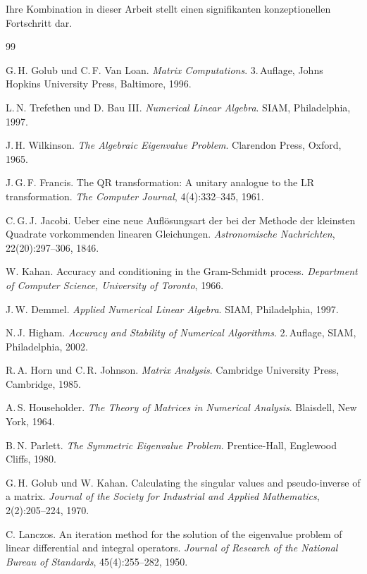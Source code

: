 \documentclass[a4paper,12pt]{article}
\theoremstyle{definition}
\begin{document}
Ihre Kombination in dieser Arbeit stellt einen signifikanten konzeptionellen Fortschritt dar.

\begin{thebibliography}{99}

G.\,H. Golub und C.\,F. Van Loan. \textit{Matrix Computations}. 3.\,Auflage, Johns Hopkins University Press, Baltimore, 1996.

L.\,N. Trefethen und D. Bau III. \textit{Numerical Linear Algebra}. SIAM, Philadelphia, 1997.

J.\,H. Wilkinson. \textit{The Algebraic Eigenvalue Problem}. Clarendon Press, Oxford, 1965.

J.\,G.\,F. Francis. The QR transformation: A unitary analogue to the LR transformation. \textit{The Computer Journal}, 4(4):332--345, 1961.

C.\,G.\,J. Jacobi. Ueber eine neue Auflösungsart der bei der Methode der kleinsten Quadrate vorkommenden linearen Gleichungen. \textit{Astronomische Nachrichten}, 22(20):297--306, 1846.

W. Kahan. Accuracy and conditioning in the Gram-Schmidt process. \textit{Department of Computer Science, University of Toronto}, 1966.

J.\,W. Demmel. \textit{Applied Numerical Linear Algebra}. SIAM, Philadelphia, 1997.

N.\,J. Higham. \textit{Accuracy and Stability of Numerical Algorithms}. 2.\,Auflage, SIAM, Philadelphia, 2002.

R.\,A. Horn und C.\,R. Johnson. \textit{Matrix Analysis}. Cambridge University Press, Cambridge, 1985.

A.\,S. Householder. \textit{The Theory of Matrices in Numerical Analysis}. Blaisdell, New York, 1964.

B.\,N. Parlett. \textit{The Symmetric Eigenvalue Problem}. Prentice-Hall, Englewood Cliffs, 1980.

G.\,H. Golub und W. Kahan. Calculating the singular values and pseudo-inverse of a matrix. \textit{Journal of the Society for Industrial and Applied Mathematics}, 2(2):205--224, 1970.

C. Lanczos. An iteration method for the solution of the eigenvalue problem of linear differential and integral operators. \textit{Journal of Research of the National Bureau of Standards}, 45(4):255--282, 1950.


\end{thebibliography}
\end{document}
